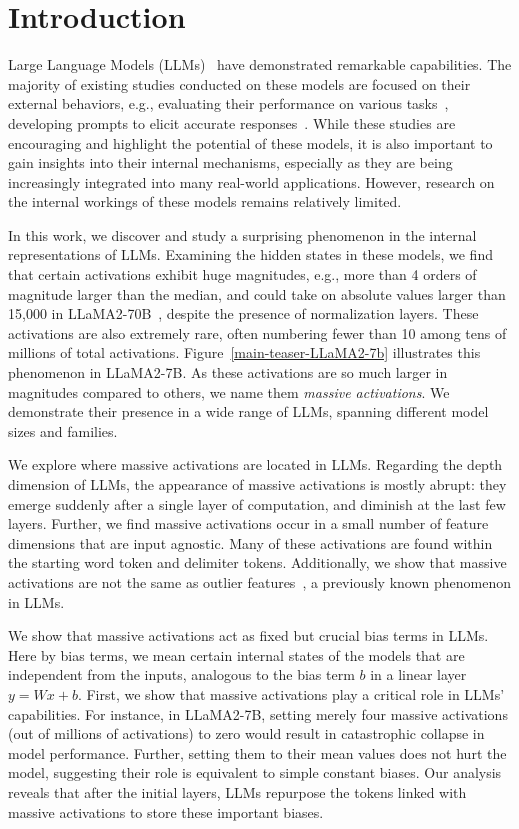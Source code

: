 \documentclass[10pt]{article}
\begin{document}
\section{Introduction}

Large Language Models (LLMs)~\citep{brown2020gpt3, openai2023gpt4} have demonstrated remarkable capabilities. The majority of existing studies conducted on these models are focused on their external behaviors, e.g., evaluating their performance on various tasks~\citep{gpt_bar,bubeck2023sparks}, developing prompts to elicit accurate responses~\citep{wei2022cot,yang2023optimizer}.  While these studies are encouraging and highlight the potential of these models, it is also important to gain insights into their internal mechanisms, especially as they are being increasingly integrated into many real-world applications. However, research on the internal workings of these models remains relatively limited. 


In this work, we discover and study a surprising phenomenon in the internal representations of LLMs. Examining the hidden states in these models, we find that certain activations exhibit huge magnitudes, e.g., more than 4 orders of magnitude larger than the median, and could take on absolute values larger than 15,000 in LLaMA2-70B~\citep{touvron2023LLaMA2}, despite the presence of normalization layers. These activations are also extremely rare, often numbering fewer than 10 among tens of millions of total activations. Figure~\ref{main-teaser-LLaMA2-7b} illustrates this phenomenon in LLaMA2-7B. As these activations are so much larger in magnitudes compared to others, we name them \textit{massive activations}. We demonstrate their presence in a wide range of LLMs, spanning different model sizes and families. 

We explore where massive activations are located in LLMs. Regarding the depth dimension of LLMs, the appearance of massive activations is mostly abrupt: they emerge suddenly after a single layer of computation, and  diminish at the last few layers. Further, we find massive activations occur in a small number of feature dimensions that are input agnostic. Many of these activations are found within the starting word token and delimiter tokens. Additionally, we show that massive activations are not the same as outlier features~\citep{dettmers2022llmint8}, a previously known phenomenon in LLMs.

We show that massive activations act as fixed but crucial bias terms in LLMs. Here by bias terms, we mean certain internal states of the models that are independent from the inputs, analogous to the bias term $b$ in a linear layer $y=Wx+b$. First, we show that massive activations play a critical role in LLMs' capabilities. For instance, in LLaMA2-7B, setting merely four massive activations (out of millions of activations) to zero would result in catastrophic collapse in model performance. Further, setting them to their mean values does not hurt the model, suggesting their role is equivalent to simple constant biases. Our analysis reveals that after the initial layers, LLMs repurpose the tokens linked with massive activations to store these important biases.
\end{document}
